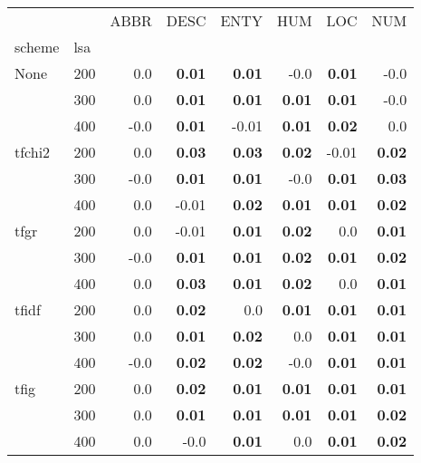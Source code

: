 \begin{table}[H]
\begin{center}

\begin{tabular}{ll|rrrrrr}
\toprule
   &   & ABBR & DESC & ENTY & HUM & LOC & NUM \\
scheme & lsa &         &         &         &         &         &         \\
\midrule
None & 200 &       0.0 &  \textbf{0.01} &  \textbf{0.01} &      -0.0 &  \textbf{0.01} &      -0.0 \\
   & 300 &       0.0 &  \textbf{0.01} &  \textbf{0.01} &  \textbf{0.01} &  \textbf{0.01} &      -0.0 \\
   & 400 &       -0.0 &  \textbf{0.01} &      -0.01 &  \textbf{0.01} &  \textbf{0.02} &       0.0 \\
tfchi2 & 200 &       0.0 &  \textbf{0.03} &  \textbf{0.03} &  \textbf{0.02} &      -0.01 &  \textbf{0.02} \\
   & 300 &       -0.0 &  \textbf{0.01} &  \textbf{0.01} &      -0.0 &  \textbf{0.01} &  \textbf{0.03} \\
   & 400 &       0.0 &      -0.01 &  \textbf{0.02} &  \textbf{0.01} &  \textbf{0.01} &  \textbf{0.02} \\
tfgr & 200 &       0.0 &      -0.01 &  \textbf{0.01} &  \textbf{0.02} &       0.0 &  \textbf{0.01} \\
   & 300 &       -0.0 &  \textbf{0.01} &  \textbf{0.01} &  \textbf{0.02} &  \textbf{0.01} &  \textbf{0.02} \\
   & 400 &       0.0 &  \textbf{0.03} &  \textbf{0.01} &  \textbf{0.02} &       0.0 &  \textbf{0.01} \\
tfidf & 200 &       0.0 &  \textbf{0.02} &       0.0 &  \textbf{0.01} &  \textbf{0.01} &  \textbf{0.01} \\
   & 300 &       0.0 &  \textbf{0.01} &  \textbf{0.02} &       0.0 &  \textbf{0.01} &  \textbf{0.01} \\
   & 400 &       -0.0 &  \textbf{0.02} &  \textbf{0.02} &      -0.0 &  \textbf{0.01} &  \textbf{0.01} \\
tfig & 200 &       0.0 &  \textbf{0.02} &  \textbf{0.01} &  \textbf{0.01} &  \textbf{0.01} &  \textbf{0.01} \\
   & 300 &       0.0 &  \textbf{0.01} &  \textbf{0.01} &  \textbf{0.01} &  \textbf{0.01} &  \textbf{0.02} \\
   & 400 &       0.0 &       -0.0 &  \textbf{0.01} &       0.0 &  \textbf{0.01} &  \textbf{0.02} \\

\end{tabular}
\end{center}
\end{table}
